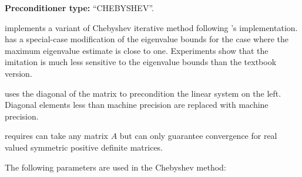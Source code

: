 \textbf{Preconditioner type:} ``CHEBYSHEV''.


\ifpacktwo{} implements a variant of Chebyshev iterative method following
\ifpack{}'s implementation.  \ifpack{} has a special-case modification of the
eigenvalue bounds for the case where the maximum eigenvalue estimate is close to
one. Experiments show that the \ifpack{} imitation is much less sensitive to the
eigenvalue bounds than the textbook version.

\ifpacktwo{} uses the diagonal of the matrix to precondition the linear system on the
left. Diagonal elements less than machine precision are replaced with machine
precision.

\ifpacktwo{} requires can take any matrix $A$ but can only guarantee convergence
for real valued symmetric positive definite matrices.
\iffalse
If users could provide the ellipse parameters ($d$ and $c$ in the literature,
where $d$ is the real-valued center of the ellipse, and $d-c$ and $d+c$ the two
foci), the iteration itself would work fine with nonsymmetric real-valued $A$,
as long as the eigenvalues of $A$ can be bounded in an ellipse that is entirely
to the right of the origin.
\unsure[inline]{AP}{Really unsure about Chebyshev nonsymmetric matrices. There does not
seem anything in the code to work with ellipse. I need to ask Mark Hoemmen
about this.}
\fi

The following parameters are used in the Chebyshev method:

